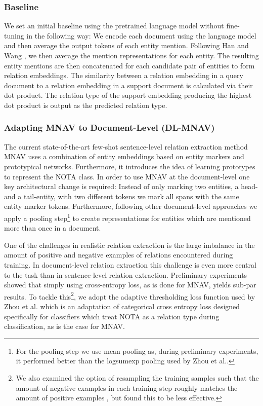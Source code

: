\documentclass[11pt]{article}
\begin{document}
\subsubsection{Baseline}
\label{subsection:baseline}
We set an initial baseline using the pretrained language model  \cite{devlin_bert_2019} without fine-tuning in the following way: We encode each document using the language model and then average the output tokens of each entity mention. Following Han and Wang \cite{han_novel_2020}, we then average the mention representations for each entity. The resulting entity mentions are then concatenated for each candidate pair of entities to form relation embeddings. The similarity between a relation embedding in a query document to a relation embedding in a support document is calculated via their dot product. The relation type of the support embedding producing the highest dot product is output as the predicted relation type.


\subsubsection{Adapting MNAV to Document-Level (DL-MNAV)}
The current state-of-the-art few-shot sentence-level relation extraction method MNAV \cite{sabo_revisiting_2021} uses a combination of entity embeddings based on entity markers and prototypical networks.
Furthermore, it introduces the idea of learning  prototypes to represent the NOTA class.
In order to use MNAV at the document-level one key architectural change is required: 
Instead of only marking two entities, a head- and a tail-entity, with two different tokens we mark all spans with the same entity marker tokens. 
Furthermore, following other document-level approaches \cite{han_novel_2020, zhou_document-level_2020} we apply a pooling step\footnote{For the pooling step we use mean pooling as, during preliminary experiments, it performed better than the logsumexp pooling used by Zhou et al..} to create representations for entities which are mentioned more than once in a document.

One of the challenges in realistic relation extraction is the large imbalance in the amount of positive and negative examples of relations encountered during training. 
In document-level relation extraction this challenge is even more central to the task than in sentence-level relation extraction. 
Preliminary experiments showed that simply using cross-entropy loss, as is done for MNAV, yields sub-par results.
To tackle this\footnote{We also examined the option of resampling the training samples such that the amount of negative examples in each training step roughly matches the amount of positive examples \cite{han_novel_2020}, but found this to be less effective.}, we adopt the adaptive thresholding loss function used by Zhou et al. \cite{zhou_document-level_2020} which is an adaptation of categorical cross entropy loss designed specifically for classifiers which treat NOTA as a relation type during classification, as is the case for MNAV.
\end{document}
